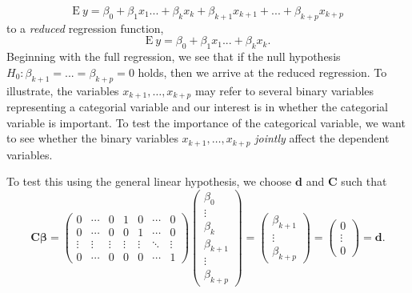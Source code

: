 \begin{equation*}
\mathrm{E~}y=\beta _{0}+\beta _{1}x_{1}...+\beta _{k}x_{k}+\beta
_{k+1}x_{k+1}+...+\beta _{k+p}x_{k+p}
\end{equation*}%
to a \emph{reduced} regression function,%
\begin{equation*}
\mathrm{E~}y=\beta _{0}+\beta _{1}x_{1}...+\beta _{k}x_{k}.
\end{equation*}%
Beginning with the full regression, we see that if the null
hypothesis $H_{0}:\beta _{k+1}=...=\beta _{k+p}=0$ holds, then we
arrive at the reduced regression. To illustrate, the variables
$x_{k+1}, \ldots, x_{k+p}$ may refer to several binary variables
representing a categorial variable and our interest is in whether
the categorial variable is important. To test the importance of the
categorical variable, we want to see whether the binary variables
$x_{k+1}, \ldots, x_{k+p}$ \emph{jointly} affect the dependent
variables.

To test this using the general linear hypothesis, we choose
$\mathbf{d}$ and
$\mathbf{C}$ such that%
\begin{equation*}
\mathbf{C\boldsymbol \beta =}\left(
\begin{array}{ccccccc}
0 & \cdots  & 0 & 1 & 0 & \cdots  & 0 \\
0 & \cdots  & 0 & 0 & 1 & \cdots  & 0 \\
\vdots  & \vdots  & \vdots  & \vdots  & \vdots  & \ddots  & \vdots  \\
0 & \cdots  & 0 & 0 & 0 & \cdots  & 1%
\end{array}%
\right) \left(
\begin{array}{c}
\beta _{0} \\
\vdots  \\
\beta _{k} \\
\beta _{k+1} \\
\vdots  \\
\beta _{k+p}%
\end{array}%
\right) =\left(
\begin{array}{c}
\beta _{k+1} \\
\vdots  \\
\beta _{k+p}%
\end{array}%
\right) =\left(
\begin{array}{c}
0 \\
\vdots  \\
0
\end{array}%
\right) =\mathbf{d}.
\end{equation*}

